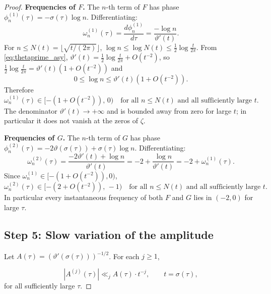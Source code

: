 \documentclass[11pt]{article}
\theoremstyle{definition}
\begin{document}
\begin{proof}
\textbf{Frequencies of $F$.}
The $n$-th term of $F$ has phase $\phi_n^{(1)}(\tau)=-\sigma(\tau)\log n$.
Differentiating:
\begin{equation}\label{eq:freq1}
\omega_n^{(1)}(\tau)
=\frac{d\phi_n^{(1)}}{d\tau}
=\frac{-\log n}{\vartheta'(t)}.
\end{equation}
For $n\le N(t)=\lfloor\sqrt{t/(2\pi)}\rfloor$,
$\log n\le\log N(t)\le\tfrac12\log\tfrac{t}{2\pi}$.
From \eqref{eq:thetaprime_asy}, $\vartheta'(t)=\tfrac12\log\tfrac{t}{2\pi}
+O(t^{-2})$, so $\tfrac12\log\tfrac{t}{2\pi}=\vartheta'(t)(1+O(t^{-2}))$
and
\[
0\le\log n\le\vartheta'(t)(1+O(t^{-2})).
\]
Therefore
\begin{equation}\label{eq:freq1_bound}
\omega_n^{(1)}(\tau)\in[-(1+O(t^{-2})),\,0)
\quad\text{for all }n\le N(t)\text{ and all sufficiently large }t.
\end{equation}
The denominator $\vartheta'(t)\to+\infty$ and is bounded away from
zero for large $t$; in particular it does not vanish at the zeros of
$\zeta$.

\textbf{Frequencies of $G$.}
The $n$-th term of $G$ has phase
$\phi_n^{(2)}(\tau)=-2\vartheta(\sigma(\tau))+\sigma(\tau)\log n$.
Differentiating:
\begin{equation}\label{eq:freq2}
\omega_n^{(2)}(\tau)
=\frac{-2\vartheta'(t)+\log n}{\vartheta'(t)}
=-2+\frac{\log n}{\vartheta'(t)}
=-2+\omega_n^{(1)}(\tau).
\end{equation}
Since $\omega_n^{(1)}\in[-(1+O(t^{-2})),0)$,
\begin{equation}\label{eq:freq2_bound}
\omega_n^{(2)}(\tau)\in[-(2+O(t^{-2})),\,-1)
\quad\text{for all }n\le N(t)\text{ and all sufficiently large }t.
\end{equation}
In particular every instantaneous frequency of both $F$ and $G$ lies
in $(-2,0)$ for large $\tau$.

\subsection*{Step 5: Slow variation of the amplitude}

Let $A(\tau)=(\vartheta'(\sigma(\tau)))^{-1/2}$.  For each $j\ge 1$,

\begin{equation}\label{eq:SV}
|A^{(j)}(\tau)|\ll_j A(\tau)\cdot t^{-j},
\qquad t=\sigma(\tau),
\end{equation}
for all sufficiently large $\tau$.


\end{proof}
\end{document}
